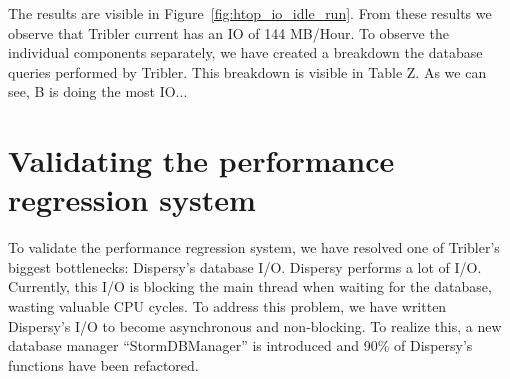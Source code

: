 The results are visible in Figure~\ref{fig:htop_io_idle_run}. 
From these results we observe that Tribler current has an IO of 144 MB/Hour.
To observe the individual components separately, we have created a breakdown the database queries performed by Tribler.
This breakdown is visible in Table Z.
As we can see, B is doing the most IO... 

\section{Validating the performance regression system}

To validate the performance regression system, we have resolved one of Tribler's biggest bottlenecks: Dispersy's database I/O.
Dispersy performs a lot of I/O.
Currently, this I/O is blocking the main thread when waiting for the database, wasting valuable CPU cycles.
To address this problem, we have written Dispersy's I/O to become asynchronous and non-blocking.
To realize this, a new database manager \enquote{StormDBManager} is introduced and 90\% of Dispersy's functions have been refactored.


